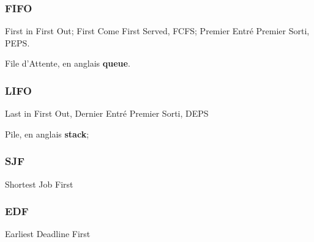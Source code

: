 \documentclass{article}
\begin{document}
\subsubsection{FIFO}
\begin{definition}
    First in First Out; First Come First Served, FCFS; Premier Entré Premier Sorti, PEPS.

    \begin{example}\label{def:queue}
        File d'Attente, en anglais \textbf{queue}.
    \end{example}
\end{definition}

\subsubsection{LIFO}
\begin{definition}
    Last in First Out, Dernier Entré Premier Sorti, DEPS
        \begin{example}\label{def:stack}
            Pile, en anglais \textbf{stack};
        \end{example}
\end{definition}

\subsubsection{SJF}
\begin{definition}
    Shortest Job First
\end{definition}

\subsubsection{EDF}
\begin{definition}
    Earliest Deadline First
\end{definition}
\end{document}
